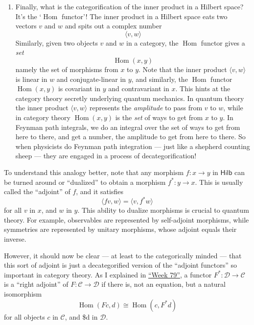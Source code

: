\documentclass{article}
\def\tightlist{}
\begin{document}
\begin{enumerate}
\def\labelenumi{\arabic{enumi})}
\setcounter{enumi}{4}
\tightlist
\item
  Finally, what is the categorification of the inner product in a
  Hilbert space? It's the `\(\operatorname{Hom}\) functor'! The inner
  product in a Hilbert space eats two vectors \(v\) and \(w\) and spits
  out a complex number \[\langle v,w \rangle\] Similarly, given two
  objects \(v\) and \(w\) in a category, the \(\operatorname{Hom}\)
  functor gives a \emph{set} \[\operatorname{Hom}(x,y)\] namely the set
  of morphisms from \(x\) to \(y\). Note that the inner product
  \(\langle v,w \rangle\) is linear in \(w\) and conjugate-linear in
  \(y\), and similarly, the \(\operatorname{Hom}\) functor
  \(\operatorname{Hom}(x,y)\) is covariant in \(y\) and contravariant in
  \(x\). This hints at the category theory secretly underlying quantum
  mechanics. In quantum theory the inner product \(\langle v,w \rangle\)
  represents the \emph{amplitude} to pass from \(v\) to \(w\), while in
  category theory \(\operatorname{Hom}(x,y)\) is the \emph{set} of ways
  to get from \(x\) to \(y\). In Feynman path integrals, we do an
  integral over the set of ways to get from here to there, and get a
  number, the amplitude to get from here to there. So when physicists do
  Feynman path integration --- just like a shepherd counting sheep ---
  they are engaged in a process of decategorification!
\end{enumerate}

To understand this analogy better, note that any morphism
\(f\colon x\to y\) in \(\mathsf{Hilb}\) can be turned around or
``dualized'' to obtain a morphism \(f^*\colon y\to x\). This is usually
called the ``adjoint'' of \(f\), and it satisfies
\[\langle fv,w \rangle = \langle v,f^*w \rangle\] for all \(v\) in
\(x\), and \(w\) in \(y\). This ability to dualize morphisms is crucial
to quantum theory. For example, observables are represented by
self-adjoint morphisms, while symmetries are represented by unitary
morphisms, whose adjoint equals their inverse.

However, it should now be clear --- at least to the categorically minded
--- that this sort of adjoint is just a decategorified version of the
``adjoint functors'' so important in category theory. As I explained in
\protect\hyperlink{week79}{``Week 79''}, a functor
\(F^*\colon\mathcal{D}\to\mathcal{C}\) is a ``right adjoint'' of
\(F\colon\mathcal{C}\to\mathcal{D}\) if there is, not an equation, but a
natural isomorphism
\[\operatorname{Hom}(Fc,d) \cong \operatorname{Hom}(c,F^*d)\] for all
objects \(c\) in \(\mathcal{C}\), and \$d in \(\mathcal{D}\).
\end{document}
